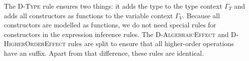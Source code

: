 The \textsc{D-Type} rule ensures two things: it adds the type to the type context $\Gamma_T$ and adds all constructors as functions to the variable context $\Gamma_V$. Because all constructors are modelled as functions, we do not need special rules for constructors in the expression inference rules. The \textsc{D-AlgebraicEffect} and \textsc{D-HigherOrderEffect} rules are split to ensure that all higher-order operations have an \el{!} suffix. Apart from that difference, these rules are identical.

\setlength{\fboxsep}{2\fboxsep}

\begin{figure}[p]
\vspace*{-2em}
\end{figure}
